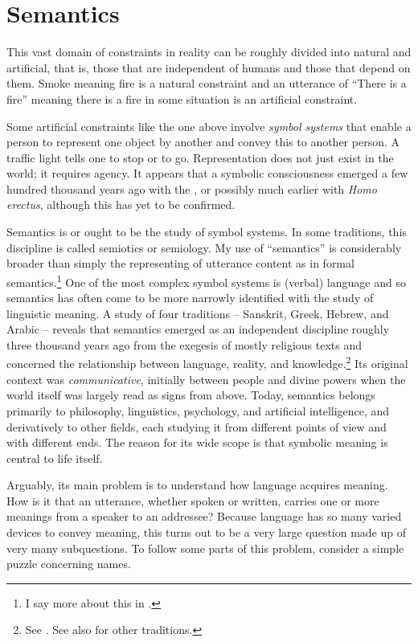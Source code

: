 \section{Semantics} \label{sec:semantics}
This vast domain of constraints in reality can be roughly divided into natural and artificial, that is, those that are independent of humans and those that depend on them. Smoke meaning fire is a natural constraint and an utterance of ``There is a fire'' meaning there is a fire in some situation is an artificial constraint.


Some artificial constraints like the one above involve \emph{symbol systems} that enable a person to represent one object by another and convey this to another person. A traffic light tells one to stop or to go. Representation does not just exist in the world; it requires agency. It appears that a symbolic consciousness emerged a few hundred thousand years ago with the , or possibly much earlier with \emph{Homo erectus}, although this has yet to be confirmed.

Semantics is or ought to be the study of symbol systems. In some traditions, this discipline is called semiotics or semiology. My use of ``semantics'' is considerably broader than simply the representing of utterance content as in formal semantics.\footnote{I say more about this in .} One of the most complex symbol systems is (verbal) language and so semantics has often come to be more narrowly identified with the study of linguistic meaning. A study of four traditions -- Sanskrit, Greek, Hebrew, and Arabic -- reveals that semantics emerged as an independent discipline roughly three thousand years ago from the exegesis of mostly religious texts and concerned the relationship between language, reality, and knowledge.\footnote{See \citet[286]{bhsv:es}. See also \citet{db:cwp} for other traditions.} Its original context was \emph{communicative}, initially between people and divine powers when the world itself was largely read as signs from above. Today, semantics belongs primarily to philosophy, linguistics, psychology, and artificial intelligence, and derivatively to other fields, each studying it from different points of view and with different ends. The reason for its wide scope is that symbolic meaning is central to life itself.

Arguably, its main problem is to understand how language acquires meaning. How is it that an utterance, whether spoken or written, carries one or more meanings from a speaker to an addressee? Because language has so many varied devices to convey meaning, this turns out to be a very large question made up of very many subquestions. To follow some parts of this problem, consider a simple puzzle concerning names.

